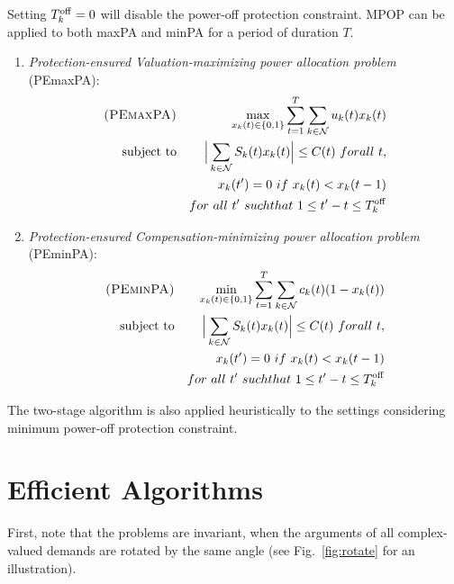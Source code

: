 Setting $T^{\rm off}_k = 0$ will disable the power-off protection constraint.
{\sc MPOP} can be applied to both {\sc maxPA} and {\sc minPA} for a period of duration $T$.
\begin{enumerate}

\item
{\em Protection-ensured Valuation-maximizing power allocation problem} ({\sc PEmaxPA}): \vspace{-5pt}
\begin{eqnarray}
\textsc{(PEmaxPA)} & & \displaystyle \max_{x_k(t) \in \{0, 1 \}} \sum_{t=1}^{T} \sum_{k\in{\cal N}}u_k(t) x_k(t) \notag \label{DAP}\\
\text{subject to} & & \displaystyle \Big|\sum_{k\in {\cal N}}S_k(t) x_k(t)\Big| \le C(t) \mbox{\ for all\ } t, \notag  \\
& & \displaystyle  x_k(t') =
0  \mbox{\ if\ } x_k(t)<x_k(t-1) \notag \\
& & \mbox{for\ all\ } t' \mbox{\ such that\ } 1 \le t' - t \le  T^{\rm off}_k  \notag \label{MPOP}
\end{eqnarray}

\item
{\em Protection-ensured Compensation-minimizing power allocation problem} ({\sc PEminPA}): \vspace{-5pt}
\begin{eqnarray}
\textsc{(PEminPA)} & & \displaystyle \min_{x_k(t) \in \{0, 1 \}} \sum_{t=1}^{T} \sum_{k\in{\cal N}}c_k(t) (1-x_k(t)) \notag \label{DAP}\\
\text{subject to} & & \displaystyle \Big|\sum_{k\in {\cal N}}S_k(t) x_k(t)\Big| \le C(t) \mbox{\ for all\ } t, \notag  \\
& & \displaystyle  x_k(t') =
0  \mbox{\ if\ } x_k(t)<x_k(t-1) \notag \\
& & \mbox{for\ all\ } t' \mbox{\ such that\ } 1 \le t' - t \le  T^{\rm off}_k  \notag \label{MPOP}
\end{eqnarray}

\end{enumerate}
The two-stage algorithm is also applied heuristically to the settings considering minimum power-off protection constraint.


\vspace{-5pt}
\section{Efficient Algorithms}\label{sec:algs}


First, note that the problems are invariant, when the arguments of all complex-valued demands are rotated by the same angle (see Fig.~\ref{fig:rotate} for an illustration). 



